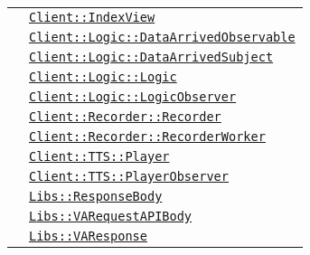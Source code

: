\begin{longtable}{|>{\centering}m{3cm}|m{10cm}<{\centering}|}
& \hyperref[Client::IndexView]{\texttt{Client::IndexView}}\\
& \hyperref[Client::Logic::DataArrivedObservable]{\texttt{Client::Logic::DataArrivedObservable}}\\
& \hyperref[Client::Logic::DataArrivedSubject]{\texttt{Client::Logic::DataArrivedSubject}}\\
& \hyperref[Client::Logic::Logic]{\texttt{Client::Logic::Logic}}\\
& \hyperref[Client::Logic::LogicObserver]{\texttt{Client::Logic::LogicObserver}}\\
& \hyperref[Client::Recorder::Recorder]{\texttt{Client::Recorder::Recorder}}\\
& \hyperref[Client::Recorder::RecorderWorker]{\texttt{Client::Recorder::RecorderWorker}}\\
& \hyperref[Client::TTS::Player]{\texttt{Client::TTS::Player}}\\
& \hyperref[Client::TTS::PlayerObserver]{\texttt{Client::TTS::PlayerObserver}}\\
& \hyperref[Libs::ResponseBody]{\texttt{Libs::ResponseBody}}\\
& \hyperref[Libs::VARequestAPIBody]{\texttt{Libs::VARequestAPIBody}}\\
& \hyperref[Libs::VAResponse]{\texttt{Libs::VAResponse}}\\ \hline


\end{longtable}
